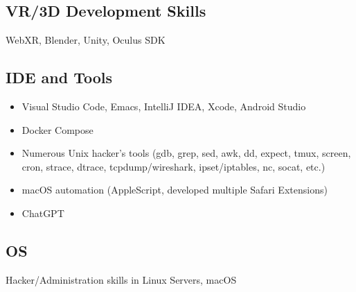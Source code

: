 \subsection*{VR/3D Development Skills}
WebXR, Blender, Unity, Oculus SDK

\subsection*{IDE and Tools}
\begin{itemize}[noitemsep, nosep]
  \item Visual Studio Code, Emacs, IntelliJ IDEA, Xcode, Android Studio
  \item Docker Compose
  \item Numerous Unix hacker's tools (gdb, grep, sed, awk, dd, expect, tmux, screen, cron, strace, dtrace, tcpdump/wireshark, ipset/iptables, nc, socat, etc.)
  \item macOS automation (AppleScript, developed multiple Safari Extensions)
  \item ChatGPT
\end{itemize}

\subsection*{OS}
Hacker/Administration skills in Linux Servers, macOS
